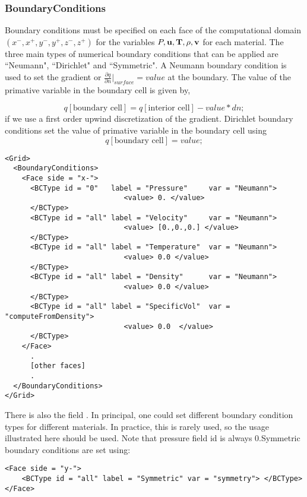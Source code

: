 \subsubsection{BoundaryConditions}
Boundary conditions must be specified on each face of the computational
domain $(x^-, x^+, y^-, y^+,z^-,z^+)$ for the variables $P, \bf{u},
T, \rho, v$ for each material.  The three main types of numerical
boundary conditions that can be applied are ``Neumann",  ``Dirichlet" and
``Symmetric".  A Neumann boundary condition is used to set the gradient
or $\frac{\partial{q}}{\partial{n}}|_{surface} = value$ at the boundary.
The value of the primative variable in the boundary cell is given by,

%
\begin{equation}
    q[\text{boundary cell}] = q[\text{interior cell}] - value * dn;
\end{equation}
%
if we use a first order upwind discretization of the gradient.  Dirichlet
boundary conditions set the value of primative variable in the boundary
cell using
%
\begin{equation}
    q[\text{boundary cell}] =  value;
\end{equation}
%
\begin{Verbatim}[fontsize=\footnotesize]
<Grid>
  <BoundaryConditions>
    <Face side = "x-">
      <BCType id = "0"   label = "Pressure"     var = "Neumann">
                            <value> 0. </value>
      </BCType>
      <BCType id = "all" label = "Velocity"     var = "Neumann">
                            <value> [0.,0.,0.] </value>
      </BCType>
      <BCType id = "all" label = "Temperature"  var = "Neumann">
                            <value> 0.0 </value>
      </BCType>
      <BCType id = "all" label = "Density"      var = "Neumann">
                            <value> 0.0 </value>
      </BCType>
      <BCType id = "all" label = "SpecificVol"  var = "computeFromDensity">
                            <value> 0.0  </value>
      </BCType>
    </Face>
      .
      [other faces]
      .
  </BoundaryConditions>
</Grid>
\end{Verbatim}
There is also the field .  In principal, one could set
different boundary condition types for different materials.  In practice,
this is rarely used, so the usage illustrated here should be used.  Note that
pressure field id is always 0.Symmetric boundary conditions are set using:
%
\begin{Verbatim}[fontsize=\footnotesize]
<Face side = "y-">
    <BCType id = "all" label = "Symmetric" var = "symmetry"> </BCType>
</Face>
\end{Verbatim}
